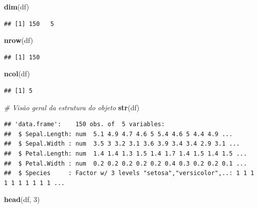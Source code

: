 \documentclass[
]{book}
\newenvironment{Shaded}{\begin{snugshade}}{\end{snugshade}}
\newcommand{\CommentTok}[1]{\textcolor[rgb]{0.56,0.35,0.01}{\textit{#1}}}
\newcommand{\DecValTok}[1]{\textcolor[rgb]{0.00,0.00,0.81}{#1}}
\newcommand{\FunctionTok}[1]{\textcolor[rgb]{0.13,0.29,0.53}{\textbf{#1}}}
\newcommand{\NormalTok}[1]{#1}
\begin{document}
\begin{Shaded}
\begin{Highlighting}[]
\FunctionTok{dim}\NormalTok{(df)}
\end{Highlighting}
\end{Shaded}

\begin{verbatim}
## [1] 150   5
\end{verbatim}

\begin{Shaded}
\begin{Highlighting}[]
\FunctionTok{nrow}\NormalTok{(df)}
\end{Highlighting}
\end{Shaded}

\begin{verbatim}
## [1] 150
\end{verbatim}

\begin{Shaded}
\begin{Highlighting}[]
\FunctionTok{ncol}\NormalTok{(df)}
\end{Highlighting}
\end{Shaded}

\begin{verbatim}
## [1] 5
\end{verbatim}

\begin{Shaded}
\begin{Highlighting}[]
\CommentTok{\# Visão geral da estrutura do objeto}
\FunctionTok{str}\NormalTok{(df)}
\end{Highlighting}
\end{Shaded}

\begin{verbatim}
## 'data.frame':    150 obs. of  5 variables:
##  $ Sepal.Length: num  5.1 4.9 4.7 4.6 5 5.4 4.6 5 4.4 4.9 ...
##  $ Sepal.Width : num  3.5 3 3.2 3.1 3.6 3.9 3.4 3.4 2.9 3.1 ...
##  $ Petal.Length: num  1.4 1.4 1.3 1.5 1.4 1.7 1.4 1.5 1.4 1.5 ...
##  $ Petal.Width : num  0.2 0.2 0.2 0.2 0.2 0.4 0.3 0.2 0.2 0.1 ...
##  $ Species     : Factor w/ 3 levels "setosa","versicolor",..: 1 1 1 1 1 1 1 1 1 1 ...
\end{verbatim}

\begin{Shaded}
\begin{Highlighting}[]
\FunctionTok{head}\NormalTok{(df, }\DecValTok{3}\NormalTok{)}
\end{Highlighting}
\end{Shaded}
\end{document}
